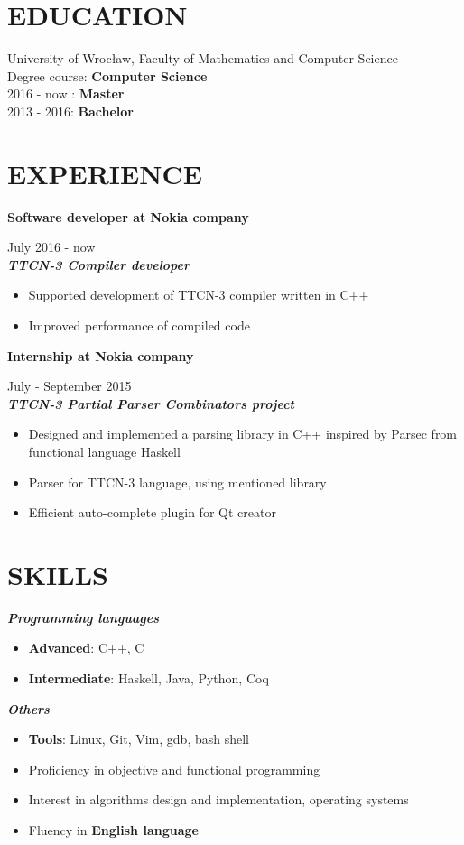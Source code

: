 \documentclass[line,overlapped]{res}
\newcommand{\textbt}[1]{\textit{\textbf{#1}}}
\begin{document}
\address{ Wrocław, przemek.lesniak1@gmail.com }
 
\begin{resume} 
\section{EDUCATION}

University of Wrocław, 
Faculty of Mathematics and Computer Science \\ 
Degree course: \textbf{Computer Science} \\ 
2016 - now : \textbf{Master} \\
2013 - 2016: \textbf{Bachelor}

\section{EXPERIENCE}
\textbf{Software developer at Nokia company} \raggedright July 2016 - now \\
\textbt{TTCN-3 Compiler developer}
\begin{itemize}
	\item{Supported development of TTCN-3 compiler written in C++}
	\item{Improved performance of compiled code}
\end{itemize}
\textbf{Internship at Nokia company} \raggedright July - September 2015 \\
\textbt{TTCN-3 Partial Parser Combinators project} 
\begin{itemize}
	\item{Designed and implemented a parsing library in C++ inspired by Parsec from functional language Haskell }
	\item{Parser for TTCN-3 language, using mentioned library }
	\item{Efficient auto-complete plugin for Qt creator } 
\end{itemize}
\section{SKILLS}

\textbt{Programming languages}
\begin{itemize}
	\item{\textbf{Advanced}: C++, C}
	\item{\textbf{Intermediate}: Haskell, Java, Python, Coq }
\end{itemize}
\textbt{Others}
\begin{itemize}
	\item{\textbf{Tools}: Linux, Git, Vim, gdb, bash shell }
	\item{Proficiency in objective and functional programming }
	\item{Interest in algorithms design and implementation, operating systems}
	\item{Fluency in \textbf{English language} }
\end{itemize}


\end{resume}
\end{document}
